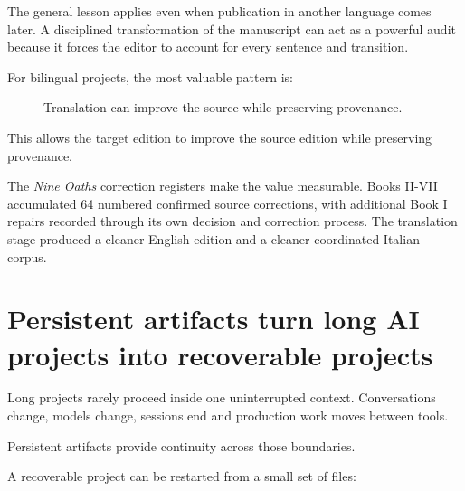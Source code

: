 \documentclass[11pt,oneside,openany]{book}
\begin{document}
The general lesson applies even when publication in another language comes later. A disciplined transformation of the manuscript can act as a powerful audit because it forces the editor to account for every sentence and transition.

For bilingual projects, the most valuable pattern is:

\begin{figure}[htbp]
\centering
{}
\caption{Translation can improve the source while preserving provenance.}
\end{figure}

This allows the target edition to improve the source edition while preserving provenance.

The \emph{Nine Oaths} correction registers make the value measurable. Books II-VII accumulated 64 numbered confirmed source corrections, with additional Book I repairs recorded through its own decision and correction process. The translation stage produced a cleaner English edition and a cleaner coordinated Italian corpus.

\chapter{Persistent artifacts turn long AI projects into recoverable projects}\label{persistent-artifacts-turn-long-ai-projects-into-recoverable-projects}

Long projects rarely proceed inside one uninterrupted context. Conversations change, models change, sessions end and production work moves between tools.

Persistent artifacts provide continuity across those boundaries.

A recoverable project can be restarted from a small set of files:
\end{document}
